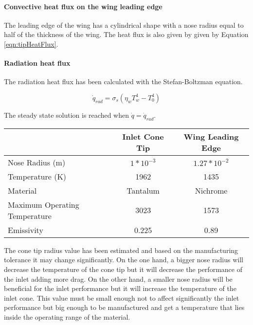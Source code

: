 \paragraph{Convective heat flux on the wing leading edge}
The leading edge of the wing has a cylindrical shape with a nose radius equal to half of the thickness of the wing. The heat flux is also given by given by Equation \ref{eqn:tipHeatFlux}.

\paragraph{Radiation heat flux}
The radiation heat flux has been calculated with the Stefan-Boltzman equation.

\begin{equation}
\dot{q}_{rad}=\sigma_s (\eta_w T_w^4-T_0^4)
\end{equation}

The steady state solution is reached when $\dot{q}=\dot{q}_{rad}$.

\begin{center}
\begin{tabular}{l c c}
& Inlet Cone Tip & Wing Leading Edge \\
\hline
Nose Radius (m) & $1*10^{-3}$ & $1.27 * 10^{-2}$ \\
Temperature (K) & 1962 & 1435 \\
Material & Tantalum & Nichrome \\
Maximum Operating Temperature & 3023 & 1573 \\
Emissivity & 0.225 & 0.89
\end{tabular}
\end{center}

The cone tip radius value has been estimated and based on the manufacturing tolerance it may change significantly. On the one hand, a bigger nose radius will decrease the temperature of the cone tip but it will decrease the performance of the inlet adding more drag. On the other hand, a smaller nose radius will be beneficial for the inlet performance but it will increase the temperature of the inlet cone. This value must be small enough not to affect significantly the inlet performance but big enough to be manufactured and get a temperature that lies inside the operating range of the material.

